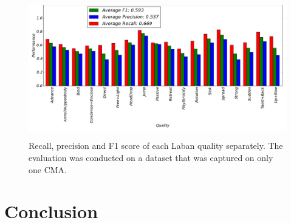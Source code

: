 \documentclass[journal]{journal}
\begin{document}
\begin{figure}
	\centering
	\includegraphics[width=\textwidth, height=60mm]{oneCMAFinalWithoutTitle.png}
	\caption{Recall, precision and F1 score of each Laban quality separately. The
	evaluation was conducted on a dataset that was captured on only one CMA.}
	\label{oneCMAFinal}
\end{figure}

\section{Conclusion}




\end{document}

